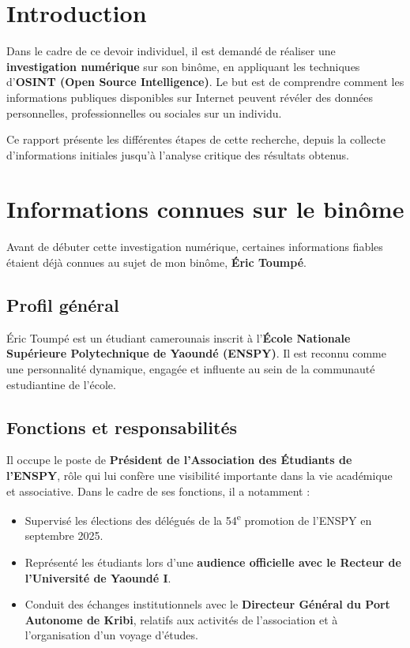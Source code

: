 \documentclass[memoire, 12pt]{report}
\begin{document}
\tableofcontents
\newpage

\chapter{Introduction}
Dans le cadre de ce devoir individuel, il est demandé de réaliser une \textbf{investigation numérique} sur son binôme, en appliquant les techniques d’\textbf{OSINT (Open Source Intelligence)}.  
Le but est de comprendre comment les informations publiques disponibles sur Internet peuvent révéler des données personnelles, professionnelles ou sociales sur un individu.

Ce rapport présente les différentes étapes de cette recherche, depuis la collecte d’informations initiales jusqu’à l’analyse critique des résultats obtenus.

\chapter{Informations connues sur le binôme}

Avant de débuter cette investigation numérique, certaines informations fiables étaient déjà connues au sujet de mon binôme, \textbf{Éric Toumpé}.

\section{Profil général}
Éric Toumpé est un étudiant camerounais inscrit à l'\textbf{École Nationale Supérieure Polytechnique de Yaoundé (ENSPY)}.  
Il est reconnu comme une personnalité dynamique, engagée et influente au sein de la communauté estudiantine de l’école.

\section{Fonctions et responsabilités}
Il occupe le poste de \textbf{Président de l’Association des Étudiants de l’ENSPY}, rôle qui lui confère une visibilité importante dans la vie académique et associative.  
Dans le cadre de ses fonctions, il a notamment :

\begin{itemize}
    \item Supervisé les élections des délégués de la 54\textsuperscript{e} promotion de l’ENSPY en septembre 2025.
    \item Représenté les étudiants lors d’une \textbf{audience officielle avec le Recteur de l’Université de Yaoundé I}.
    \item Conduit des échanges institutionnels avec le \textbf{Directeur Général du Port Autonome de Kribi}, relatifs aux activités de l’association et à l’organisation d’un voyage d’études.
\end{itemize}
\end{document}
